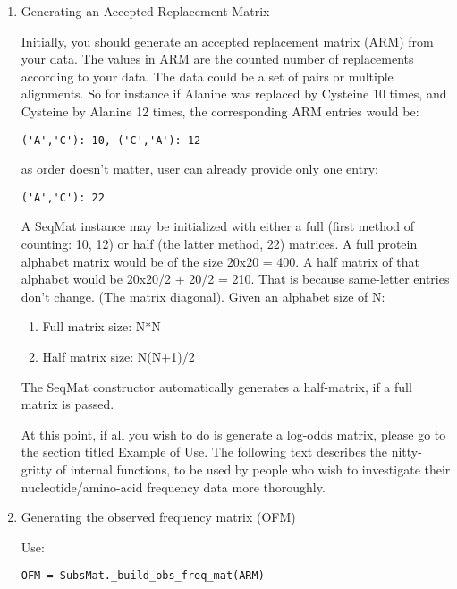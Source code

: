 \begin{enumerate}
   \begin{enumerate}

   \item Generating an Accepted Replacement Matrix

   Initially, you should generate an accepted replacement matrix (ARM) from your data. The values in ARM are the counted number of replacements according to your data. The data could be a set of pairs or multiple alignments. So for instance if Alanine was replaced by Cysteine 10 times, and Cysteine by Alanine 12 times, the corresponding ARM entries would be:

\begin{verbatim}
('A','C'): 10, ('C','A'): 12
\end{verbatim}

as order doesn't matter, user can already provide only one entry:

\begin{verbatim}
('A','C'): 22
\end{verbatim}

 A SeqMat instance may be initialized with either a full (first method of counting: 10, 12) or half (the latter method, 22) matrices. A full protein alphabet matrix would be of the size 20x20 = 400. A half matrix of that alphabet would be 20x20/2 + 20/2 = 210. That is because same-letter entries don't change. (The matrix diagonal). Given an alphabet size of N:

   \begin{enumerate}
     \item Full matrix size: N*N

     \item Half matrix size: N(N+1)/2
   \end{enumerate}

The SeqMat constructor automatically generates a half-matrix, if a full matrix is passed.

At this point, if all you wish to do is generate a log-odds matrix, please go to the section titled Example of Use. The following text describes the nitty-gritty of internal functions, to be used by people who wish to investigate their nucleotide/amino-acid frequency data more thoroughly.

\item Generating the observed frequency matrix (OFM)

Use:
\begin{verbatim}
OFM = SubsMat._build_obs_freq_mat(ARM)
\end{verbatim}


\end{enumerate}
\end{enumerate}
